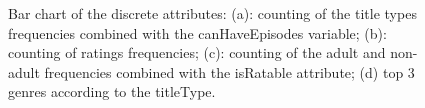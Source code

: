 \begin{figure}[h!]
    \centering
    \caption{Bar chart of the discrete attributes: (a): counting of the title types frequencies combined with the canHaveEpisodes variable; (b): counting of ratings frequencies; (c): counting of the adult and non-adult frequencies combined with the isRatable attribute; (d) top 3 genres according to the titleType.}
    \label{fig:bar-charts}
\end{figure}

